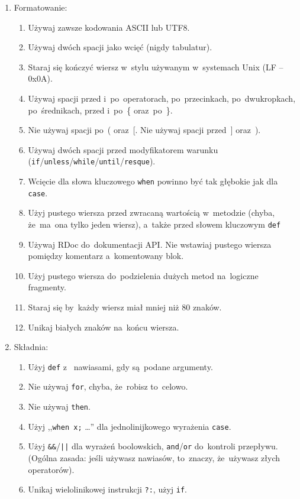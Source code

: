 \begin{enumerate}
  \item Formatowanie:
  \begin{enumerate}
    \item Używaj zawsze kodowania ASCII lub UTF8.
    \item Używaj dwóch spacji jako wcięć (nigdy tabulatur).
    \item Staraj się kończyć wiersz w~stylu używanym w~systemach Unix (LF -- 0x0A).
    \item Używaj spacji przed i~po~operatorach, po~przecinkach, po~dwukropkach, po~średnikach, przed i~po~\{ oraz~po~\}.
    \item Nie używaj spacji po~( oraz~[. Nie używaj spacji przed~] oraz~).
    \item Używaj dwóch spacji przed modyfikatorem warunku (\texttt{if}/\texttt{unless}/\texttt{while}/\texttt{until}/\texttt{resque}).
    \item Wcięcie dla słowa kluczowego \texttt{when} powinno być tak głębokie jak dla \texttt{case}.
    \item Użyj pustego wiersza przed zwracaną wartością w~metodzie (chyba, że~ma~ona tylko jeden wiersz), a~także przed słowem kluczowym \texttt{def}
    \item Używaj RDoc do~dokumentacji API. Nie wstawiaj pustego wiersza pomiędzy komentarz a~komentowany blok.
    \item Użyj pustego wiersza do~podzielenia dużych metod na~logiczne fragmenty.
    \item Staraj się by~każdy wiersz miał mniej niż 80 znaków.
    \item Unikaj białych znaków na~końcu wiersza.
  \end{enumerate}
  \item Składnia:
  \begin{enumerate}
    \item Użyj \texttt{def} z~ nawiasami, gdy są~podane argumenty.
    \item Nie używaj \texttt{for}, chyba, że~robisz to~celowo.
    \item Nie używaj \texttt{then}.
    \item Użyj ,,\texttt{when x;} \ldots'' dla jednolinijkowego wyrażenia \texttt{case}.
    \item Użyj \texttt{\&\&}/\texttt{||} dla wyrażeń boolowskich, \texttt{and}/\texttt{or} do~kontroli przepływu. (Ogólna zasada: jeśli używasz nawiasów, to~znaczy, że~używasz złych operatorów).
    \item Unikaj wielolinikowej instrukcji \texttt{?:}, użyj \texttt{if}.

\end{enumerate}
\end{enumerate}
